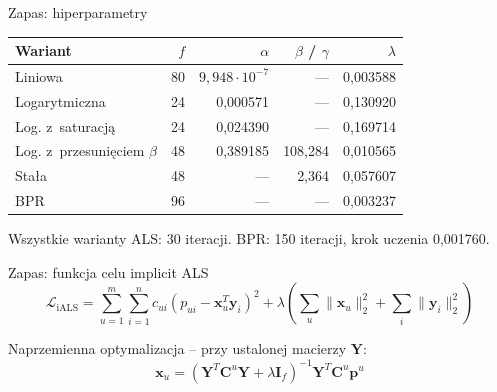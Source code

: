 \documentclass[aspectratio=169,11pt]{beamer}
\begin{document}
\begin{frame}{Zapas: hiperparametry}
  \centering\small
  \begin{tabular}{lrrrr}
    \toprule
    Wariant & $f$ & $\alpha$ & $\beta$ / $\gamma$ & $\lambda$ \\
    \midrule
    Liniowa & 80 & $9{,}948\cdot10^{-7}$ & --- & 0,003588 \\
    Logarytmiczna & 24 & 0,000571 & --- & 0,130920 \\
    Log. z~saturacją & 24 & 0,024390 & --- & 0,169714 \\
    Log. z~przesunięciem $\beta$ & 48 & 0,389185 & 108,284 & 0,010565 \\
    Stała & 48 & --- & 2,364 & 0,057607 \\
    BPR & 96 & --- & --- & 0,003237 \\
    \bottomrule
  \end{tabular}

  \vspace{1em}
  \small Wszystkie warianty ALS: 30 iteracji. BPR: 150 iteracji, krok uczenia 0,001760.
\end{frame}


\begin{frame}{Zapas: funkcja celu implicit ALS}
  \begin{equation*}
    \mathcal{L}_{\text{iALS}} = \sum_{u=1}^{m}\sum_{i=1}^{n} c_{ui}\left(p_{ui} -
    \mathbf{x}_u^T\mathbf{y}_i\right)^2 + \lambda\left(\sum_u \|\mathbf{x}_u\|_2^2 +
    \sum_i \|\mathbf{y}_i\|_2^2\right)
  \end{equation*}

  \vspace{1em}
  Naprzemienna optymalizacja -- przy ustalonej macierzy $\mathbf{Y}$:
  \begin{equation*}
    \mathbf{x}_u = \left(\mathbf{Y}^T\mathbf{C}^u\mathbf{Y} + \lambda\mathbf{I}_f\right)^{-1}
    \mathbf{Y}^T\mathbf{C}^u\mathbf{p}^u
  \end{equation*}
\end{frame}

\end{document}
